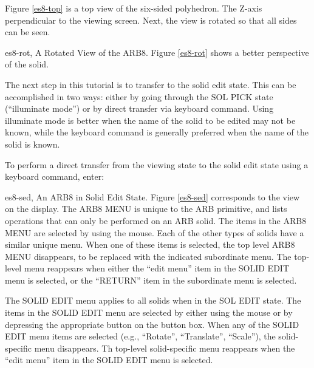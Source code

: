 Figure \ref{es8-top}
is a top view of the six-sided polyhedron.
The Z-axis perpendicular to the viewing screen.
Next, the view is rotated so that all sides can be seen.


\mfig es8-rot, A Rotated View of the ARB8.
Figure \ref{es8-rot} shows a better perspective of the solid.

The next step in this tutorial is to transfer to the solid edit state.
This can be accomplished in two ways:  either by going through
the SOL PICK state (``illuminate mode'') or by direct transfer via
keyboard command.
Using illuminate mode is better when the name of the solid to be
edited may not be known, while the keyboard command is generally
preferred when the name of the solid is known.


To perform a direct transfer from the viewing state to the solid edit state
using a keyboard command, enter:


\mfig es8-sed, An ARB8 in Solid Edit State.
Figure \ref{es8-sed} corresponds to the view on the display.
The ARB8 MENU is unique to the ARB primitive,
and lists operations that can only be performed on an ARB solid.
The items in the ARB8 MENU are
selected by using the mouse.
Each of the other types of solids have a
similar unique menu.
When one of these items is selected, the top level ARB8 MENU disappears,
to be replaced with the indicated subordinate menu.
The top-level menu reappears when either
the ``edit menu'' item in the SOLID EDIT menu is selected,
or the ``RETURN'' item in the subordinate menu is selected.

The  SOLID EDIT  menu applies to all
solids when in the SOL EDIT state.
The items in the  SOLID EDIT  menu are selected
by either using the mouse or by depressing the appropriate button on the
button box.
When any of the SOLID EDIT menu items are selected
(e.g., ``Rotate'', ``Translate'', ``Scale''), the solid-specific menu
disappears.
Th top-level solid-specific menu reappears when
the ``edit menu'' item in the SOLID EDIT menu is selected.

